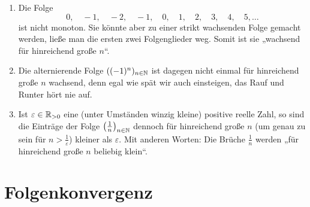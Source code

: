 \begin{bsp} \label{bsp:eventually} \quad
    \begin{enumerate}
        \item Die Folge
            \[ 0,\quad -1,\quad -2,\quad -1,\quad 0,\quad 1,\quad 2,\quad 3,\quad 4, \quad 5,\dots \]
        ist nicht monoton. Sie könnte aber zu einer strikt wachsenden Folge gemacht werden, ließe man die ersten zwei Folgenglieder weg. Somit ist sie „wachsend für hinreichend große $n$“.
        \item Die alternierende Folge $((-1)^n)_{n\in \mathbb N}$ ist dagegen nicht einmal für hinreichend große $n$ wachsend, denn egal wie spät wir auch einsteigen, das Rauf und Runter hört nie auf.
        \item Ist $\varepsilon \in \mathbb R_{>0}$ eine (unter Umständen winzig kleine) positive reelle Zahl, so sind die Einträge der Folge $\left(\frac{1}{n}\right)_{n\in \mathbb N}$ dennoch für hinreichend große $n$ (um genau zu sein für $n> \frac{1}{\varepsilon}$) kleiner als $\varepsilon$. Mit anderen Worten: Die Brüche $\frac{1}{n}$ werden „für hinreichend große $n$ beliebig klein“.
    \end{enumerate}
\end{bsp}





\section{Folgenkonvergenz}


